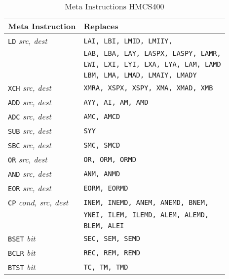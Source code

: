 \documentclass[12pt,twoside]{report}
\newcommand{\tty}[1]{{\tt #1}}
\begin{document}
\begin{table*}
\begin{center}\begin{tabular}{|l|l|}
\hline
Meta Instruction          & Replaces \\
\hline
\tty{LD} {\em src, dest}        & \tty{LAI, LBI, LMID, LMIIY,} \\
                                & \tty{LAB, LBA, LAY, LASPX, LASPY, LAMR,} \\
                                & \tty{LWI, LXI, LYI, LXA, LYA, LAM, LAMD} \\
                                & \tty{LBM, LMA, LMAD, LMAIY, LMADY} \\
\tty{XCH} {\em src, dest}       & \tty{XMRA, XSPX, XSPY, XMA, XMAD, XMB} \\
\tty{ADD} {\em src, dest}       & \tty{AYY, AI, AM, AMD} \\
\tty{ADC} {\em src, dest}       & \tty{AMC, AMCD} \\
\tty{SUB} {\em src, dest}       & \tty{SYY} \\
\tty{SBC} {\em src, dest}       & \tty{SMC, SMCD} \\
\tty{OR}  {\em src, dest}       & \tty{OR, ORM, ORMD} \\
\tty{AND} {\em src, dest}       & \tty{ANM, ANMD} \\
\tty{EOR} {\em src, dest}       & \tty{EORM, EORMD} \\
\tty{CP}  {\em cond, src, dest} & \tty{INEM, INEMD, ANEM, ANEMD, BNEM,} \\
                                & \tty{YNEI, ILEM, ILEMD, ALEM, ALEMD,} \\
                                & \tty{BLEM, ALEI} \\
\tty{BSET} {\em bit}            & \tty{SEC, SEM, SEMD} \\
\tty{BCLR} {\em bit}            & \tty{REC, REM, REMD} \\
\tty{BTST} {\em bit}            & \tty{TC, TM, TMD} \\
\hline
\end{tabular}\end{center}
\caption{Meta Instructions HMCS400}
\label{TabHMCS400Meta}
\end{table*}
\end{document}
